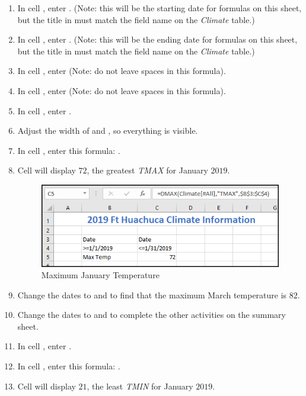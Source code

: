\begin{enumbox}
\begin{enumerate}
		\item In cell , enter . (Note: this will be the starting date for formulas on this sheet, but the title in  must match the field name on the \textit{Climate} table.)
		\item In cell , enter . (Note: this will be the ending date for formulas on this sheet, but the title in  must match the field name on the \textit{Climate} table.)
		\item In cell , enter  (Note: do not leave spaces in this formula).
		\item In cell , enter  (Note: do not leave spaces in this formula).
		\item In cell , enter .
		\item Adjust the width of  and , so everything is visible.
		\item In cell , enter this formula: .
		\item Cell  will display $ 72 $, the greatest \textit{TMAX} for January $ 2019 $.
	
		\begin{figure}[H]
			\centering
			\includegraphics[width=\maxwidth{.95\linewidth}]{gfx/ch09_fig86}
			\caption{Maximum January Temperature}
			\label{09:fig86}
		\end{figure}
	
		\item Change the dates to  and  to find that the maximum March temperature is $ 82 $.
		\item Change the dates to  and  to complete the other activities on the summary sheet.
	
		\item In cell , enter .
		\item In cell , enter this formula: .
		\item Cell  will display $ 21 $, the least \textit{TMIN} for January $ 2019 $.
	

\end{enumerate}
\end{enumbox}
